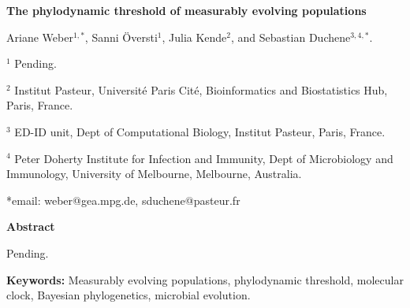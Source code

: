 \documentclass[11pt]{article}
\begin{document}
\begin{flushright}

\end{flushright}
\begin{center}
	\begin{LARGE}
	\textbf{The phylodynamic threshold of measurably evolving populations}
	\end{LARGE}

Ariane Weber$^{1,*}$, Sanni Översti$^{1}$, Julia Kende$^{2}$, and Sebastian Duchene$^{3,4,*}$.
\end{center}

$^{1}$ Pending.

$^{2}$ Institut Pasteur, Université Paris Cité, Bioinformatics and Biostatistics Hub, Paris, France.

$^{3}$ ED-ID unit, Dept of Computational Biology, Institut Pasteur, Paris, France.

$^{4}$ Peter Doherty Institute for Infection and Immunity, Dept of Microbiology and Immunology, University of Melbourne, Melbourne, Australia.


*email: weber@gea.mpg.de, sduchene@pasteur.fr
\newline

\begin{Large}
	\textbf{Abstract}
\end{Large}

Pending.

\textbf{Keywords:} Measurably evolving populations, phylodynamic threshold, molecular clock, Bayesian phylogenetics, microbial evolution.


\end{document}
